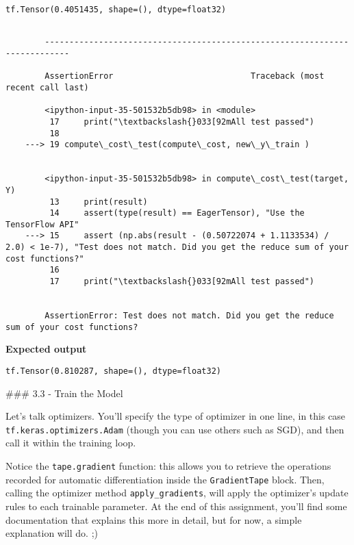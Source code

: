 \documentclass[11pt]{article}
\begin{document}
    \begin{Verbatim}[commandchars=\\\{\}]
tf.Tensor(0.4051435, shape=(), dtype=float32)
    \end{Verbatim}

    \begin{Verbatim}[commandchars=\\\{\}]

        ---------------------------------------------------------------------------

        AssertionError                            Traceback (most recent call last)

        <ipython-input-35-501532b5db98> in <module>
         17     print("\textbackslash{}033[92mAll test passed")
         18 
    ---> 19 compute\_cost\_test(compute\_cost, new\_y\_train )
    

        <ipython-input-35-501532b5db98> in compute\_cost\_test(target, Y)
         13     print(result)
         14     assert(type(result) == EagerTensor), "Use the TensorFlow API"
    ---> 15     assert (np.abs(result - (0.50722074 + 1.1133534) / 2.0) < 1e-7), "Test does not match. Did you get the reduce sum of your cost functions?"
         16 
         17     print("\textbackslash{}033[92mAll test passed")


        AssertionError: Test does not match. Did you get the reduce sum of your cost functions?

    \end{Verbatim}

    \textbf{Expected output}

\begin{verbatim}
tf.Tensor(0.810287, shape=(), dtype=float32)
\end{verbatim}

    \#\#\# 3.3 - Train the Model

Let's talk optimizers. You'll specify the type of optimizer in one line,
in this case \texttt{tf.keras.optimizers.Adam} (though you can use
others such as SGD), and then call it within the training loop.

Notice the \texttt{tape.gradient} function: this allows you to retrieve
the operations recorded for automatic differentiation inside the
\texttt{GradientTape} block. Then, calling the optimizer method
\texttt{apply\_gradients}, will apply the optimizer's update rules to
each trainable parameter. At the end of this assignment, you'll find
some documentation that explains this more in detail, but for now, a
simple explanation will do. ;)
\end{document}
